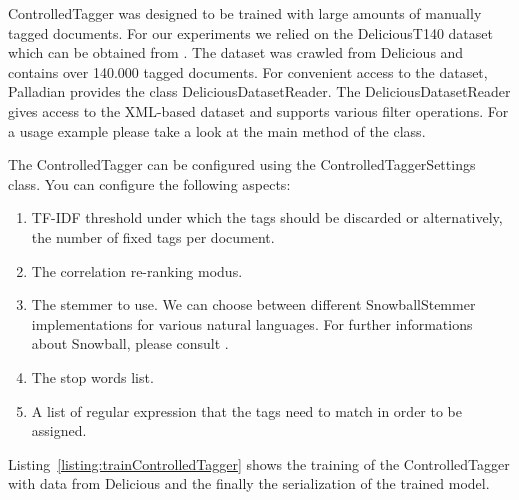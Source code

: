 \documentclass[a4paper,twoside]{book}      %
\begin{document}

ControlledTagger was designed to be trained with large amounts of manually tagged documents. For our experiments we relied on the DeliciousT140 dataset which can be obtained from \cite{deliciousT140}. The dataset was crawled from Delicious and contains over 140.000 tagged documents. For convenient access to the dataset, Palladian provides the class DeliciousDatasetReader. The DeliciousDatasetReader gives access to the XML-based dataset and supports various filter operations. For a usage example please take a look at the main method of the class.

The ControlledTagger can be configured using the ControlledTaggerSettings class. You can configure the following aspects:

\begin{enumerate}
\item TF-IDF threshold under which the tags should be discarded or alternatively, the number of fixed tags per document.
\item The correlation re-ranking modus.
\item The stemmer to use. We can choose between different SnowballStemmer implementations for various natural languages. For further informations about Snowball, please consult \cite{snowball}.
\item The stop words list.
\item A list of regular expression that the tags need to match in order to be assigned.
\end{enumerate}

Listing~\ref{listing:trainControlledTagger} shows the training of the ControlledTagger with data from Delicious and the finally the serialization of the trained model.
\end{document}
